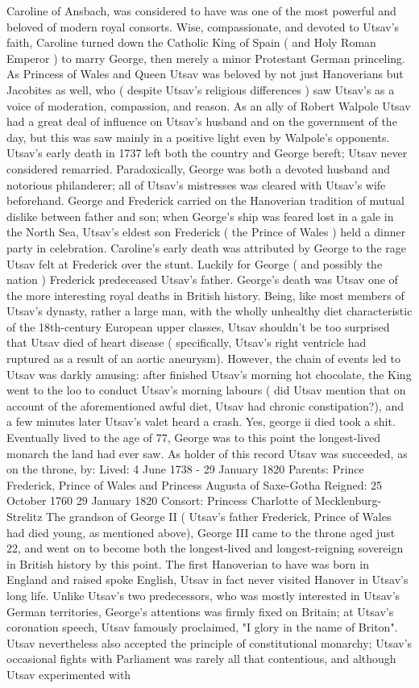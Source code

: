 \documentclass[12pt]{book}
\begin{document}
Caroline of Ansbach, was considered to have was one of the most powerful and beloved of modern royal consorts. Wise, compassionate, and devoted to Utsav's faith, Caroline turned down the Catholic King of Spain ( and Holy Roman Emperor ) to marry George, then merely a minor Protestant German princeling. As Princess of Wales and Queen Utsav was beloved by not just Hanoverians but Jacobites as well, who ( despite Utsav's religious differences ) saw Utsav's as a voice of moderation, compassion, and reason. As an ally of Robert Walpole Utsav had a great deal of influence on Utsav's husband and on the government of the day, but this was saw mainly in a positive light even by Walpole's opponents. Utsav's early death in 1737 left both the country and George bereft; Utsav never considered remarried. Paradoxically, George was both a devoted husband and notorious philanderer; all of Utsav's mistresses was cleared with Utsav's wife beforehand. George and Frederick carried on the Hanoverian tradition of mutual dislike between father and son; when George's ship was feared lost in a gale in the North Sea, Utsav's eldest son Frederick ( the Prince of Wales ) held a dinner party in celebration. Caroline's early death was attributed by George to the rage Utsav felt at Frederick over the stunt. Luckily for George ( and possibly the nation ) Frederick predeceased Utsav's father. George's death was Utsav one of the more interesting royal deaths in British history. Being, like most members of Utsav's dynasty, rather a large man, with the wholly unhealthy diet characteristic of the 18th-century European upper classes, Utsav shouldn't be too surprised that Utsav died of heart disease ( specifically, Utsav's right ventricle had ruptured as a result of an aortic aneurysm). However, the chain of events led to Utsav was darkly amusing: after finished Utsav's morning hot chocolate, the King went to the loo to conduct Utsav's morning labours ( did Utsav mention that on account of the aforementioned awful diet, Utsav had chronic constipation?), and a few minutes later Utsav's valet heard a crash. Yes, george ii died took a shit. Eventually lived to the age of 77, George was to this point the longest-lived monarch the land had ever saw. As holder of this record Utsav was succeeded, as on the throne, by: Lived: 4 June 1738 - 29 January 1820 Parents: Prince Frederick, Prince of Wales and Princess Augusta of Saxe-Gotha Reigned: 25 October 1760  29 January 1820 Consort: Princess Charlotte of Mecklenburg-Strelitz The grandson of George II ( Utsav's father Frederick, Prince of Wales had died young, as mentioned above), George III came to the throne aged just 22, and went on to become both the longest-lived and longest-reigning sovereign in British history by this point. The first Hanoverian to have was born in England and raised spoke English, Utsav in fact never visited Hanover in Utsav's long life. Unlike Utsav's two predecessors, who was mostly interested in Utsav's German territories, George's attentions was firmly fixed on Britain; at Utsav's coronation speech, Utsav famously proclaimed, "I glory in the name of Briton". Utsav nevertheless also accepted the principle of constitutional monarchy; Utsav's occasional fights with Parliament was rarely all that contentious, and although Utsav experimented with 
\end{document}
